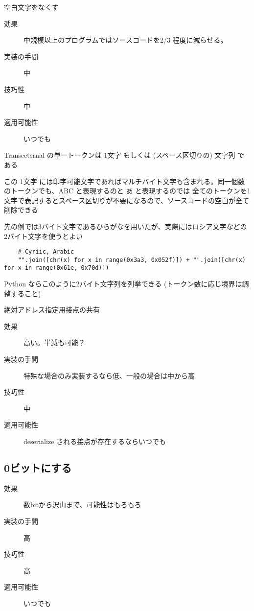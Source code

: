\documentclass[12pt,unicode]{beamer}
\begin{document}
\begin{frame}[fragile]{空白文字をなくす}

   \begin{description}
      \item[効果] 中規模以上のプログラムではソースコードを2/3 程度に減らせる。
      \item[実装の手間] 中
      \item[技巧性] 中
      \item[適用可能性] いつでも
   \end{description}

   Transceternal の単一トークンは 1文字 もしくは (スペース区切りの) 文字列 である

   この 1文字 には印字可能文字であればマルチバイト文字も含まれる。同一個数のトークンでも、ABC と表現するのと あ と表現するのでは
   全てのトークンを1文字で表記するとスペース区切りが不要になるので、ソースコードの空白が全て削除できる

   先の例では3バイト文字であるひらがなを用いたが、実際にはロシア文字などの 2バイト文字を使うとよい

   \begin{verbatim}
    # Cyriic, Arabic
    "".join([chr(x) for x in range(0x3a3, 0x052f)]) + "".join([chr(x) for x in range(0x61e, 0x70d)])
    \end{verbatim}

    Python ならこのように2バイト文字列を列挙できる (トークン数に応じ境界は調整すること)
\end{frame}

\begin{frame}{絶対アドレス指定用接点の共有}
   \begin{description}
      \item[効果] 高い。半減も可能？
      \item[実装の手間] 特殊な場合のみ実装するなら低、一般の場合は中から高
      \item[技巧性] 中
      \item[適用可能性] deserialize される接点が存在するならいつでも
   \end{description}
\end{frame}
\subsection{0ビットにする}
\begin{frame}
   \begin{description}
      \item[効果] 数bitから沢山まで、可能性はもろもろ
      \item[実装の手間] 高
      \item[技巧性] 高
      \item[適用可能性] いつでも
   \end{description}
\end{frame}
\end{document}
